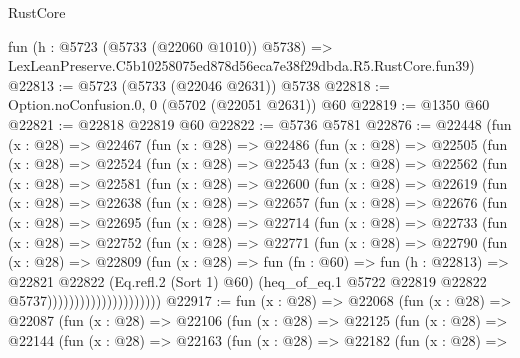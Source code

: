 \begin{lexlean}{RustCore}
\begin{coremodule}
    fun (h : @5723 (@5733 (@22060 @1010)) @5738) =>
    LexLeanPreserve.C5b10258075ed878d56eca7e38f29dbda.R5.RustCore.fun39)
@22813 := @5723 (@5733 (@22046 @2631)) @5738
@22818 := Option.noConfusion.{0, 0} (@5702 (@22051 @2631)) @60
@22819 := @1350 @60
@22821 := @22818 @22819 @60
@22822 := @5736 @5781
@22876 := @22448
    (fun (x : @28) =>
    @22467
      (fun (x : @28) =>
      @22486
        (fun (x : @28) =>
        @22505
          (fun (x : @28) =>
          @22524
            (fun (x : @28) =>
            @22543
              (fun (x : @28) =>
              @22562
                (fun (x : @28) =>
                @22581
                  (fun (x : @28) =>
                  @22600
                    (fun (x : @28) =>
                    @22619
                      (fun (x : @28) =>
                      @22638
                        (fun (x : @28) =>
                        @22657
                          (fun (x : @28) =>
                          @22676
                            (fun (x : @28) =>
                            @22695
                              (fun (x : @28) =>
                              @22714
                                (fun (x : @28) =>
                                @22733
                                  (fun (x : @28) =>
                                  @22752
                                    (fun (x : @28) =>
                                    @22771
                                      (fun (x : @28) =>
                                      @22790
                                        (fun (x : @28) =>
                                        @22809
                                          (fun (x : @28) =>
                                          fun (fn : @60) =>
                                          fun (h : @22813) =>
                                          @22821
                                            @22822
                                            (Eq.refl.{2} (Sort 1) @60)
                                            (heq_of_eq.{1}
                                              @5722
                                              @22819
                                              @22822
                                              @5737)))))))))))))))))))))
@22917 := fun (x : @28) =>
  @22068
    (fun (x : @28) =>
    @22087
      (fun (x : @28) =>
      @22106
        (fun (x : @28) =>
        @22125
          (fun (x : @28) =>
          @22144
            (fun (x : @28) =>
            @22163
              (fun (x : @28) =>
              @22182
                (fun (x : @28) =>

\end{coremodule}
\end{lexlean}
